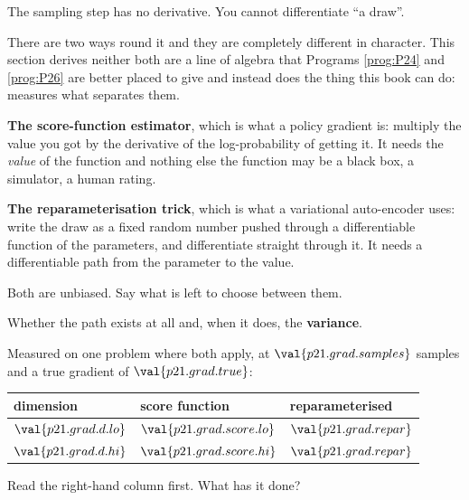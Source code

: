 \begin{fr}
\begin{ansblock}
The sampling step has no derivative. You cannot differentiate \enquote{a
draw}.
\end{ansblock}

There are two ways round it and they are completely different in character.
This section derives neither \dash{} both are a line of algebra that
Programs \ref{prog:P24} and \ref{prog:P26} are better placed to give \dash{}
and instead does the thing this book can do: measures what separates them.

\end{fr}

\begin{fr}
\textbf{The score-function estimator}, which is what a policy gradient is:
multiply the value you got by the derivative of the log-probability of getting
it. It needs the \emph{value} of the function and nothing else \dash{} the
function may be a black box, a simulator, a human rating.

\textbf{The reparameterisation trick}, which is what a variational
auto-encoder uses: write the draw as a fixed random number pushed through a
differentiable function of the parameters, and differentiate straight through
it. It needs a differentiable path from the parameter to the value.

Both are unbiased. Say what is left to choose between them.
\nextframe
\end{fr}

\begin{fr}
\begin{ansblock}
Whether the path exists at all \dash{} and, when it does, the
\textbf{variance}.
\end{ansblock}

Measured on one problem where both apply, at $\val{p21.grad.samples}$ samples
and a true gradient of $\val{p21.grad.true}$:

\begin{center}
\begin{tabular}{lll}
\toprule
dimension & score function & reparameterised \\
\midrule
$\val{p21.grad.d.lo}$ & $\val{p21.grad.score.lo}$ & $\val{p21.grad.repar}$ \\
$\val{p21.grad.d.hi}$ & $\val{p21.grad.score.hi}$ & $\val{p21.grad.repar}$ \\
\bottomrule
\end{tabular}
\end{center}

Read the right-hand column first. What has it done?
\nextframe
\end{fr}

